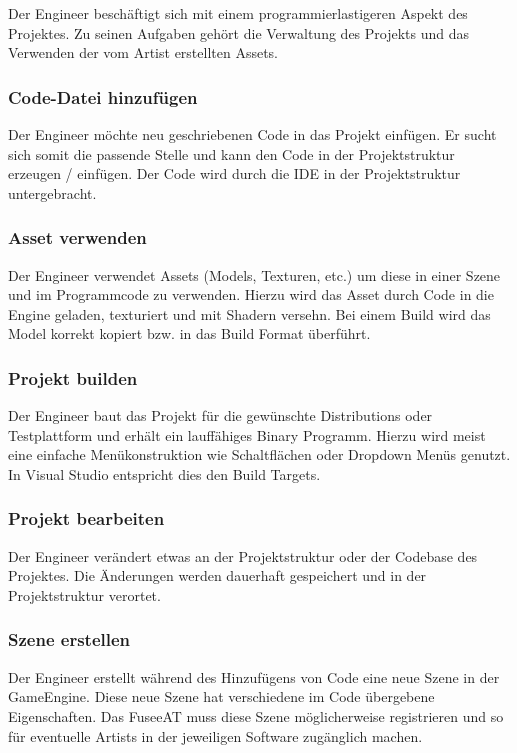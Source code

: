 \documentclass[pagesize, paper=a4, fontsize=12pt, titlepage=true, headings=small, headnosepline, abstractoff, liststotoc, nochapterprefix, plainheadsepline, twoside]{scrreprt}
\begin{document}
Der Engineer beschäftigt sich mit einem programmierlastigeren Aspekt des Projektes. Zu seinen Aufgaben gehört die Verwaltung des Projekts und das Verwenden der vom Artist erstellten Assets.

\subsubsection{Code-Datei hinzufügen}
Der Engineer möchte neu geschriebenen Code in das Projekt einfügen. Er sucht sich somit die passende Stelle und kann den Code in der Projektstruktur erzeugen / einfügen. Der Code wird durch die IDE in der Projektstruktur untergebracht.

\subsubsection{Asset verwenden}
Der Engineer verwendet Assets (Models, Texturen, etc.) um diese in einer Szene und im Programmcode zu verwenden. Hierzu wird das Asset durch Code in die Engine geladen, texturiert und mit Shadern versehn. Bei einem Build wird das Model korrekt kopiert bzw. in das Build Format überführt.

\subsubsection{Projekt builden}
Der Engineer baut das Projekt für die gewünschte Distributions oder Testplattform und erhält ein lauffähiges Binary Programm. Hierzu wird meist eine einfache Menükonstruktion wie Schaltflächen oder Dropdown Menüs genutzt. In Visual Studio entspricht dies den Build Targets.

\subsubsection{Projekt bearbeiten}
Der Engineer verändert etwas an der Projektstruktur oder der Codebase des Projektes. Die Änderungen werden dauerhaft gespeichert und in der Projektstruktur verortet.

\subsubsection{Szene erstellen}
Der Engineer erstellt während des Hinzufügens von Code eine neue Szene in der GameEngine. Diese neue Szene hat verschiedene im Code übergebene Eigenschaften. Das FuseeAT muss diese Szene möglicherweise registrieren und so für eventuelle Artists in der jeweiligen Software zugänglich machen.
\end{document}
